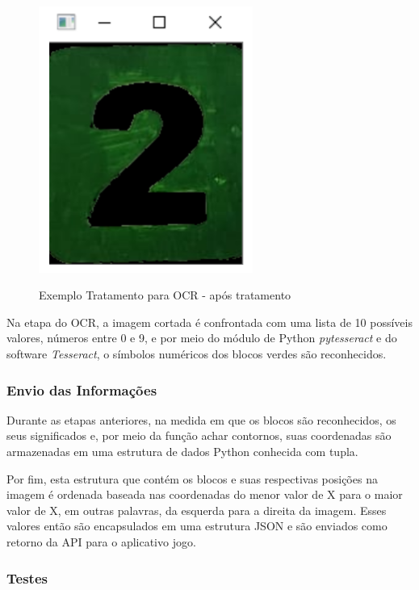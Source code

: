     
    \begin{figure}[H]
        \caption{Exemplo Tratamento para OCR - após tratamento}
        \centering
        \includegraphics[width=7cm]{Imagens/Cap4/ex2_tratado.PNG}
        \label{figura:ex2_tratado}
    \end{figure}
    
    Na etapa do OCR, a imagem cortada é confrontada com uma lista de 10 possíveis valores, números entre 0 e 9, e por meio do módulo de Python \textit{pytesseract} e do software \textit{Tesseract}, o símbolos numéricos dos blocos verdes são reconhecidos.


    \subsubsection{Envio das Informações}
    Durante as etapas anteriores, na medida em que os blocos são reconhecidos, os seus significados e, por meio da função achar contornos, suas coordenadas são armazenadas em uma estrutura de dados Python conhecida com tupla.
    
    Por fim, esta estrutura que contém os blocos e suas respectivas posições na imagem é ordenada baseada nas coordenadas do menor valor de X para o maior valor de X, em outras palavras, da esquerda para a direita da imagem. Esses valores então são  encapsulados em uma estrutura JSON e são enviados como retorno da API para o aplicativo jogo.

    \subsubsection{Testes}
    
